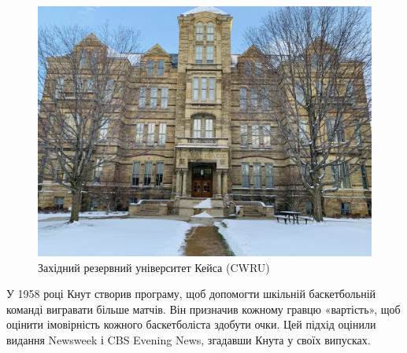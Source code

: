 \documentclass{article}
\begin{document}
\begin{figure}[ht]
    \centering
    \begin{minipage}{0.5\textwidth}
        \centering
        \includegraphics[width=\linewidth]{CWRU.jpg}
    \end{minipage}%
    \hspace{0.5cm}
    \begin{minipage}{0.4\textwidth}
        \raggedright 
        \caption{Західний резервний університет Кейса (CWRU)}
        \label{fig:cwru}
    \end{minipage}
\end{figure}

У 1958 році Кнут створив програму, щоб допомогти шкільній баскетбольній команді вигравати більше матчів. Він призначив кожному гравцю «вартість», щоб оцінити імовірність кожного баскетболіста здобути очки. Цей підхід оцінили видання Newsweek і CBS Evening News, згадавши Кнута у своїх випусках.
\end{document}
